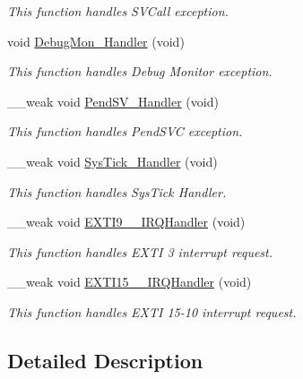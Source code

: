 \begin{DoxyCompactItemize}
\begin{DoxyCompactList}\small\item\em This function handles S\+V\+Call exception. \end{DoxyCompactList}\item 
void \hyperlink{group___template___project_gadbdfb05858cc36fc520974df37ec3cb0}{Debug\+Mon\+\_\+\+Handler} (void)
\begin{DoxyCompactList}\small\item\em This function handles Debug Monitor exception. \end{DoxyCompactList}\item 
\+\_\+\+\_\+weak void \hyperlink{group___template___project_ga27e01c2c3e61bcc3dffd74f506002306}{Pend\+S\+V\+\_\+\+Handler} (void)
\begin{DoxyCompactList}\small\item\em This function handles Pend\+S\+V\+C exception. \end{DoxyCompactList}\item 
\+\_\+\+\_\+weak void \hyperlink{group___template___project_gab894b5e9fe1586f1e7b812e29593cc23}{Sys\+Tick\+\_\+\+Handler} (void)
\begin{DoxyCompactList}\small\item\em This function handles Sys\+Tick Handler. \end{DoxyCompactList}\item 
\+\_\+\+\_\+weak void \hyperlink{group___template___project_gaa4451aa358df9d896e67520a373d1aca}{E\+X\+T\+I9\+\_\+\_\+\+I\+R\+Q\+Handler} (void)
\begin{DoxyCompactList}\small\item\em This function handles E\+X\+T\+I 3 interrupt request. \end{DoxyCompactList}\item 
\+\_\+\+\_\+weak void \hyperlink{group___template___project_ga1400207b0d81e34bad614c4798ec5694}{E\+X\+T\+I15\+\_\+\_\+\+I\+R\+Q\+Handler} (void)
\begin{DoxyCompactList}\small\item\em This function handles E\+X\+T\+I 15-\/10 interrupt request. \end{DoxyCompactList}\end{DoxyCompactItemize}


\subsection{Detailed Description}


